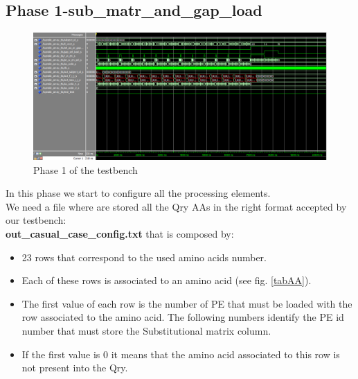 \subsection{Phase 1-sub\_matr\_and\_gap\_load }
\begin{figure}[h!]
	\centering
	\includegraphics[width=\textwidth]{imm/sw/configuration_phase.png} 	\caption{Phase 1 of the testbench} 
	\label{tb_sw_1}
\end{figure}
In this phase we start to configure all the processing elements.\\
We need a file where are stored all the Qry AAs in the right format accepted by our testbench:\\
\textbf{out\_casual\_case\_config.txt} that is composed by:\\
\begin{itemize}
\item 23 rows that correspond to the used amino acids number. 
\item Each of these rows is associated to an amino acid (see fig. \ref{tabAA}). 
\item The first value of each row is the number of PE that must be loaded with the row associated to the amino acid. The following numbers identify the PE id number that must store the Substitutional matrix column. 
\item If the first value is 0 it means that the amino acid associated to this row is not present into the Qry.
\end{itemize}
